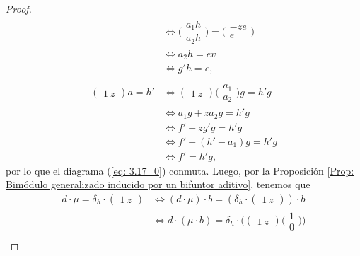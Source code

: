 \documentclass[tesis]{subfiles}
\begin{document}
\begin{proof}
\begin{align*}
                 &\iff \big( \begin{smallmatrix} a_1h \\ a_2h \end{smallmatrix} \big) = \big( \begin{smallmatrix} -ze \\ e \end{smallmatrix} \big) \\
                 &\iff a_2h = ev \\
                 &\iff g'h=e, \\ \\
            ( \begin{smallmatrix} 1 \ z \end{smallmatrix} ) a = h' &\iff ( \begin{smallmatrix} 1 \ z \end{smallmatrix} ) \big( \begin{smallmatrix} a_1 \\ a_2 \end{smallmatrix} \big) g = h'g \\
                                                                   &\iff a_1 g + za_2 g = h'g \\
                                                                   &\iff f' + zg'g = h'g \\
                                                                   &\iff f' + (h'-a_1)g = h'g \\
                                                                   &\iff f' = h'g, \tag{puesto que $(h'-a_1)g=f'-f'$}
    \end{align*}
    por lo que el diagrama (\ref{eq: 3.17_0}) conmuta. Luego, por la Proposición \ref{Prop: Bimódulo generalizado inducido por un bifuntor aditivo}, tenemos que
    \begin{align*}
        d\cdot\mu = \delta_h\cdot(\begin{smallmatrix} 1 \ z \end{smallmatrix}) &\iff (d\cdot\mu)\cdot b = (\delta_h\cdot(\begin{smallmatrix} 1 \ z \end{smallmatrix}))\cdot b \\
                                                                               &\iff d\cdot (\mu\cdot b) = \delta_h\cdot\big( (\begin{smallmatrix} 1 \ z \end{smallmatrix}) \big( \begin{smallmatrix} 1 \\ 0 \end{smallmatrix} \big)  \big) \\

\end{align*}
\end{proof}
\end{document}
